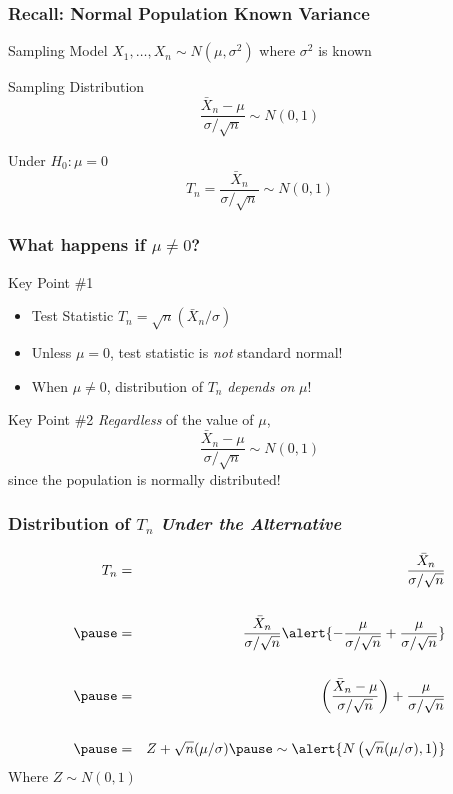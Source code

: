\documentclass[handout]{beamer}
\begin{document}
\begin{frame}
	\frametitle{Recall: Normal Population Known Variance}
	\begin{block}
		{Sampling Model}
		$X_1, \hdots, X_n \sim N(\mu, \sigma^2)$ where $\sigma^2$ is known
	\end{block}
	\begin{block}
		{Sampling Distribution}
		$$\frac{\bar{X}_n - \mu}{\sigma/\sqrt{n}} \sim N(0,1)$$
	\end{block}
	\begin{block}
		{Under $H_0\colon \mu = 0$}
		$$T_n = \frac{\bar{X}_n}{\sigma/\sqrt{n}} \sim N(0,1)$$
	\end{block}
\end{frame}

\begin{frame}
	\frametitle{What happens if $\mu \neq 0$?}
	\begin{alertblock}
		{Key Point \#1}
		\begin{itemize}
			\item Test Statistic $T_n=\sqrt{n}(\bar{X}_n/\sigma)$
			\item Unless $\mu = 0$, test statistic is \emph{not} standard normal!
			\item When $\mu \neq 0$, distribution of $T_n$ \emph{depends on} $\mu$!	
		\end{itemize}
	\end{alertblock}
	\begin{alertblock}
		{Key Point \#2}
		\emph{Regardless} of the value of $\mu$,
			$$\frac{\bar{X}_n - \mu}{\sigma/\sqrt{n}} \sim N(0,1)$$
		since the population is normally distributed!
	\end{alertblock}
\end{frame}
\begin{frame}
	\frametitle{Distribution of $T_n$ \emph{Under the Alternative}}
	\begin{eqnarray*}
		T_n &=& \frac{\bar{X}_n}{\sigma/\sqrt{n}}\\\\ \pause
		&=& \frac{\bar{X}_n}{\sigma/\sqrt{n}} \alert{- \frac{\mu}{\sigma/\sqrt{n}} + \frac{\mu}{\sigma/\sqrt{n}}} \\ \\ \pause
		&=& \left( \frac{\bar{X}_n - \mu}{\sigma/\sqrt{n}} \right) + \frac{\mu}{\sigma/\sqrt{n}} \\ \\ \pause
		&=& Z + \sqrt{n}(\mu/\sigma) \pause 
		\sim \alert{N\left( \sqrt{n}(\mu/\sigma),1  \right)} 
	\end{eqnarray*}
	Where $Z \sim N(0,1)$
\end{frame}
\end{document}
